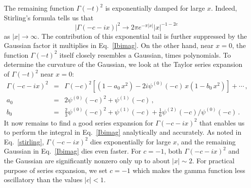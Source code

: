 \documentclass[a4,letterpaper,11pt]{article}
\newcommand{\nn}{\nonumber}
\newcommand{\be}{\begin{equation}}
\newcommand{\ee}{\end{equation}}
\newcommand{\bea}{\begin{eqnarray}}
\newcommand{\eea}{\end{eqnarray}}
\newcommand{\abs}[1]{\left\lvert #1\right\rvert}
\newcommand{\eq}[1]{Eq.~\eqref{#1}}
\begin{document}
The remaining function $\Gamma(-t)^2$ is exponentially damped for large $x$. Indeed, Stirling's formula tells us that
\be
\label{stirling}
\abs{\Gamma(-c-ix)}^2 \to 2\pi e^{-\pi\abs{x}} \abs{x}^{-1-2c}
\ee
as $\abs{x}\to \infty$. The contribution of this exponential tail is further suppressed by the Gaussian factor it multiplies in \eq{Ibimag}.
On the other hand, near $x=0$, the function $\Gamma(-t)^2$ itself closely resembles a Gaussian, times polynomials. To determine the curvature of the Gaussian, we look at the Taylor series expansion of $\Gamma(-t)^2$ near $x=0$:
\bea \label{gexpansion}
\Gamma(-c-ix)^2 &=&\Gamma(-c)^2 \left[(1 - a_0\, x^2)-2i \psi^{(0)}(-c)\, x(1-b_0\, x^2) \right]+\cdots
\,,\\ \nn
a_0&=&2 \psi^{(0)}( -c)^2 + \psi^{(1)}( -c)
\,,\\ \nn
b_0 &=& \tfrac{2}{3} \psi^{(0)}( -c)^2 + \psi^{(1)}( -c) +\tfrac{1}{6} \psi^{(2)}( -c)/\psi^{(0)}( -c)
\,.\eea
It now remains to find a good series expansion for $\Gamma(-c-ix)^2$ that enables us to perform the integral in \eq{Ibimag} analytically and accurately. As noted in \eq{stirling}, $\Gamma(-c-ix)^2$ dies exponentially for large $x$, and the remaining Gaussian in \eq{Ibimag} dies even faster. For $c=-1$, both $\Gamma(-c-ix)^2$ and the Gaussian are significantly nonzero only up to about $\abs{x}\sim 2$. For practical purpose of series expansion, we set $c=-1$ which makes the gamma function less oscillatory than the values $|c|<1$.
\end{document}

